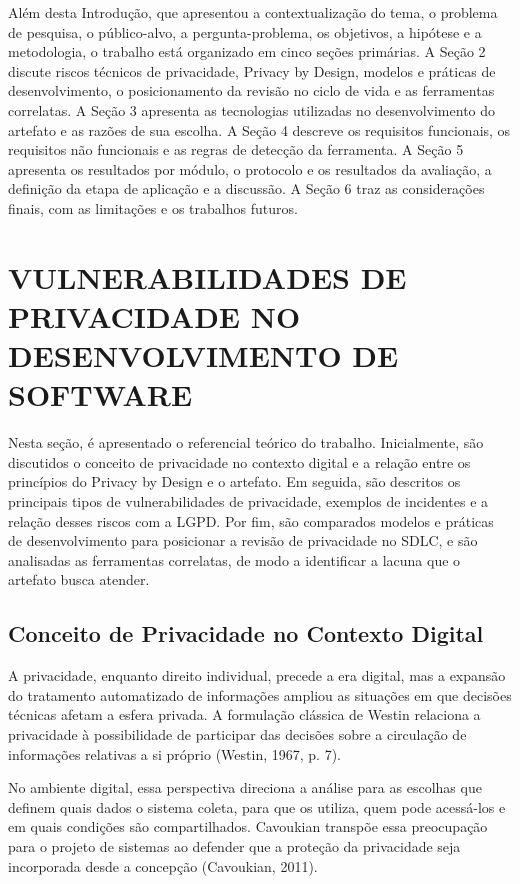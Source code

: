 \documentclass[12pt,a4paper,oneside]{report}
\begin{document}
Além desta Introdução, que apresentou a contextualização do tema, o problema de pesquisa, o público-alvo, a pergunta-problema, os objetivos, a hipótese e a metodologia, o trabalho está organizado em cinco seções primárias. A Seção 2 discute riscos técnicos de privacidade, Privacy by Design, modelos e práticas de desenvolvimento, o posicionamento da revisão no ciclo de vida e as ferramentas correlatas. A Seção 3 apresenta as tecnologias utilizadas no desenvolvimento do artefato e as razões de sua escolha. A Seção 4 descreve os requisitos funcionais, os requisitos não funcionais e as regras de detecção da ferramenta. A Seção 5 apresenta os resultados por módulo, o protocolo e os resultados da avaliação, a definição da etapa de aplicação e a discussão. A Seção 6 traz as considerações finais, com as limitações e os trabalhos futuros.

\setcounter{chapter}{1}

\chapter{VULNERABILIDADES DE PRIVACIDADE NO DESENVOLVIMENTO DE SOFTWARE}

Nesta seção, é apresentado o referencial teórico do trabalho. Inicialmente, são discutidos o conceito de privacidade no contexto digital e a relação entre os princípios do Privacy by Design e o artefato. Em seguida, são descritos os principais tipos de vulnerabilidades de privacidade, exemplos de incidentes e a relação desses riscos com a LGPD. Por fim, são comparados modelos e práticas de desenvolvimento para posicionar a revisão de privacidade no SDLC, e são analisadas as ferramentas correlatas, de modo a identificar a lacuna que o artefato busca atender.

\section{Conceito de Privacidade no Contexto Digital}

A privacidade, enquanto direito individual, precede a era digital, mas a expansão do tratamento automatizado de informações ampliou as situações em que decisões técnicas afetam a esfera privada. A formulação clássica de Westin relaciona a privacidade à possibilidade de participar das decisões sobre a circulação de informações relativas a si próprio (Westin, 1967, p. 7).

No ambiente digital, essa perspectiva direciona a análise para as escolhas que definem quais dados o sistema coleta, para que os utiliza, quem pode acessá-los e em quais condições são compartilhados. Cavoukian transpõe essa preocupação para o projeto de sistemas ao defender que a proteção da privacidade seja incorporada desde a concepção (Cavoukian, 2011).
\end{document}
